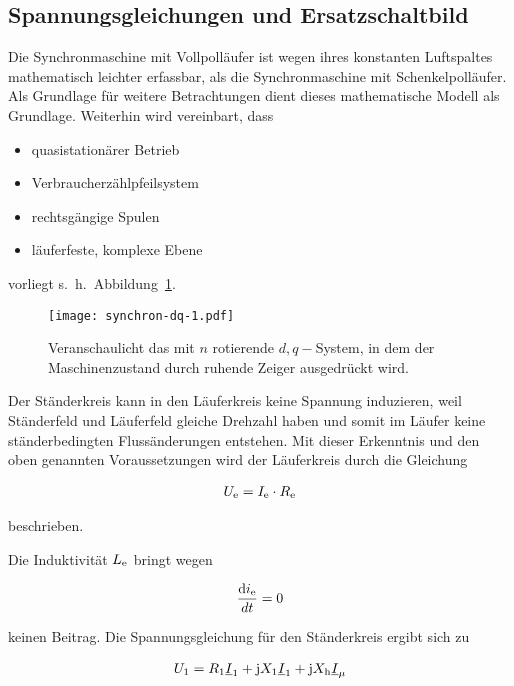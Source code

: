 \subsection{Spannungsgleichungen und Ersatzschaltbild}

Die Synchronmaschine mit Vollpolläufer ist wegen ihres konstanten Luftspaltes mathematisch leichter erfassbar, als die Synchronmaschine mit Schenkelpolläufer.
Als Grundlage für weitere Betrachtungen dient dieses mathematische Modell als Grundlage.
Weiterhin wird vereinbart, dass

\begin{itemize}
	\item quasistationärer Betrieb
	\item Verbraucherzählpfeilsystem
	\item rechtsgängige Spulen
	\item läuferfeste, komplexe Ebene
\end{itemize}

vorliegt s.~h.~Abbildung~\ref{fig:dq-synchron-1}.

\begin{figure}[!h]
\centering
\texttt{[image: synchron-dq-1.pdf]}
\label{fig:dq-synchron-1}
\caption{Veranschaulicht das mit $n$ rotierende $d, q-$System, in dem der Maschinenzustand durch ruhende Zeiger ausgedrückt wird.}
\end{figure}

Der Ständerkreis kann in den Läuferkreis keine Spannung induzieren, weil Ständerfeld und Läuferfeld gleiche Drehzahl haben und somit im Läufer keine ständerbedingten Flussänderungen entstehen.
Mit dieser Erkenntnis und den oben genannten Voraussetzungen wird der Läuferkreis durch die Gleichung

\begin{align}
U_{\mathrm{e}} = I_{\mathrm{e}} \cdot R_{\mathrm{e}}
\end{align}

beschrieben.

Die Induktivität $L_{\mathrm{e}}$ bringt wegen

\begin{align*}
\frac{\mathrm{d}i_{\mathrm{e}}}{dt} = 0
\end{align*}

keinen Beitrag.
Die Spannungsgleichung für den Ständerkreis ergibt sich zu

\begin{align}
U_{\mathrm{1}} = R_{\mathrm{1}}\underline{I}_{\mathrm{1}}+\mathrm{j}X_{\mathrm{1}}\underline{I}_{\mathrm{1}}+\mathrm{j}X_{\mathrm{h}}\underline{I}_\mu
\end{align}

